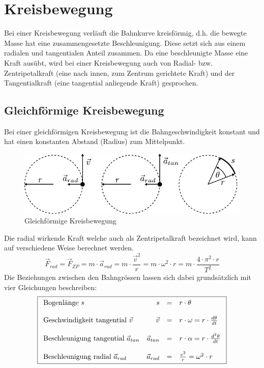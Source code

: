 \chapter{Kreisbewegung}
Bei einer Kreisbewegung verläuft die Bahnkurve kreisförmig,
d.h. die bewegte Masse hat eine zusammengesetzte Beschleunigung.
Diese setzt sich aus einem radialen und tangentialen Anteil 
zusammen. Da eine beschleunigte Masse eine Kraft ausübt, wird 
bei einer Kreisbewegung auch von Radial- bzw. Zentripetalkraft
(eine nach innen, zum Zentrum gerichtete Kraft) und der 
Tangentialkraft (eine tangential anliegende Kraft) gesprochen.

\newpage
\section{Gleichförmige Kreisbewegung}
Bei einer gleichförmigen Kreisbewegung ist die Bahngeschwindigkeit
konstant und hat einen konstanten Abstand (Radius) zum Mittelpunkt.

\begin{figure}[h!]
	\centering
	\includegraphics[scale=0.8]{kreisbewegung.pdf}
	\caption{Gleichförmige Kreisbewegung}
	\label{fig:kreisbewegung}
\end{figure}

\noindent
Die radial wirkende Kraft welche auch als Zentripetalkraft 
bezeichnet wird, kann auf verschiedene Weise berechnet werden.
\[ \boxed{\vec{F}_{rad} = \vec{F}_{ZP} 
	= m \cdot \vec{a}_{rad}
	= m \cdot \frac{\vec{v}^2}{r} 
	= m \cdot \omega^2 \cdot r 
	= m \cdot \frac{4 \cdot \pi^2 \cdot r}{T^2} } \]
Die Beziehungen zwischen den Bahngrössen lassen sich dabei 
grundsätzlich mit vier Gleichungen beschreiben:
\[ \boxed{ \begin{array}{l r c l}
	\text{Bogenlänge $s$} & 
		s &=& r \cdot \theta \\
	& & & \\
	\text{Geschwindigkeit tangential $\vec{v}$} &
		\vec{v} &=& r \cdot \omega
		= r \cdot \frac{d\theta}{dt} \\
	& & & \\
	\text{Beschleunigung tangential $\vec{a}_{tan}$} &
		\vec{a}_{tan} &=& r \cdot \alpha 
		= r \cdot \frac{d^2\theta}{dt} \\
	& & & \\
	\text{Beschleunigung radial $\vec{a}_{rad}$} &
		\vec{a}_{rad} &=& \frac{v^2}{r} = \omega^2 \cdot r
\end{array} }\]

